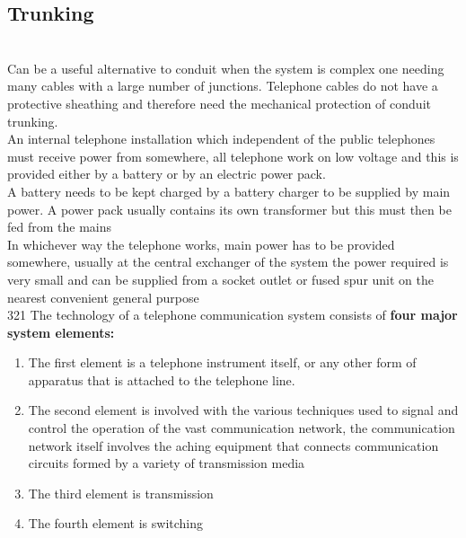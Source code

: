 \documentclass[12pt,fleqn]{book} %
\begin{document}
\subsection{Trunking}
\\ Can be a useful alternative to conduit when the system is complex one needing many cables with a large number of junctions. Telephone cables do not have a protective sheathing and therefore need the mechanical protection of conduit trunking.
\\ An internal telephone installation which independent of the public telephones must receive power from somewhere, all telephone work on low voltage and this is provided either by a battery or by an electric power pack.
\\ A battery needs to be kept charged by a battery charger to be supplied by main power. A power pack usually contains its own transformer but this must then be fed from the mains
\\ In whichever way the telephone works, main power has to be provided somewhere, usually at the central exchanger of the system the power required is very small and can be supplied from a socket outlet or fused spur unit on the nearest convenient general purpose
\\ 321 The technology of a telephone communication system consists of \textbf{four major system elements:}
\begin{enumerate}
    \item The first element is a telephone instrument itself, or any other form of apparatus that is attached to the telephone line.
    \item The second element is involved with the various techniques used to signal and control the operation of the vast communication network, the communication network itself involves the aching equipment that connects communication circuits formed by a variety of transmission media
    \item The third element is transmission
    \item The fourth element is switching 
\end{enumerate}
\end{document}
